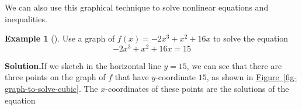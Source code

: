\documentclass[10pt,]{book}
\theoremstyle{plain}
\theoremstyle{definition}
\theoremstyle{definition}
\newtheorem{example}[theorem]{Example}
\numberwithin{equation}{section}
\newcounter{figstack}
\newlength\fight
\newcommand\pushValignCaptionBottom[5][b]{%
\stepcounter{figstack}%
\expandafter\def\csname %
figalign\romannumeral\value{figstack}\endcsname{#1}%
\expandafter\def\csname %
figtype\romannumeral\value{figstack}\endcsname{#2}%
\expandafter\def\csname %
figwd\romannumeral\value{figstack}\endcsname{#3}%
\expandafter\def\csname %
figcontent\romannumeral\value{figstack}\endcsname{#4}%
\expandafter\def\csname %
figcap\romannumeral\value{figstack}\endcsname{#5}%
\setbox0=\hbox{%
\begin{#2}{#3}#4\end{#2}}%
\ifdim\dimexpr\ht0+\dp0\relax>\fight\global\setlength{\fight}{%
\dimexpr\ht0+\dp0\relax}\fi%
}
\newcommand{\alert}[1]{\mathbf{\color{magenta}{#1}}}
\begin{document}
\par
We can also use this graphical technique to solve nonlinear equations and inequalities.%
\begin{example}[]\label{example-graph-to-solve-cubic}
Use a graph of \(f(x) = −2x^3 + x^2 + 16x\) to solve the equation 
    \begin{equation*}−2x^3 + x^2 + 16x = 15\end{equation*}%
\par\medskip\noindent%
\textbf{Solution.}\quad If we sketch in the horizontal line \(y = 15\), we can see that there are three points on the graph of \(f\) that have \(y\)-coordinate \(15\), as shown in \hyperref[fig-graph-to-solve-cubic]{Figure~\ref{fig-graph-to-solve-cubic}}. The \(x\)-coordinates of these points are the solutions of the equation %
\leavevmode%
\end{example}
\end{document}
